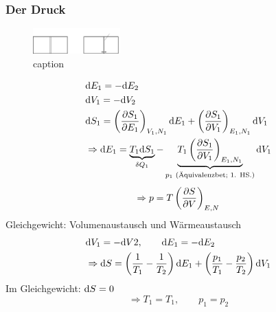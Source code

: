 \subsubsection{Der Druck}
\begin{figure}[H]
    \begin{center}
        \includegraphics[width=0.3\textwidth]{../img/derivationP.pdf}
        \caption{caption}  %
        \label{img:derivatoinP}
    \end{center}
\end{figure}
\begin{equation}
    \begin{split}
        & \mathrm{d} E_1 = - \mathrm{d} E_2 \\
        & \mathrm{d} V_1 = - \mathrm{d} V_2 \\
        & \mathrm{d} S_1 = \left( \frac{\partial S_1}{\partial E_1} \right)_{V_1, N_1} \mathrm{d} E_1 + \left( \frac{\partial S_1}{\partial V_1} \right)_{E_1, N_1} \mathrm{d} V_1 \\
        & \Rightarrow \mathrm{d} E_1 = \underbrace{T_1 \mathrm{d} S_1}_{\delta Q_1} - \underbrace{T_1 \left( \frac{\partial S_1}{\partial V_1} \right)_{E_1, N_1}}_{p_1 \text{ (Äquivalenzbet; 1. HS.)}} \mathrm{d} V_1
    \end{split}
\end{equation}
\begin{equation}
    \Rightarrow p = T \left( \frac{\partial S}{\partial V} \right)_{E, N}
\end{equation}
Gleichgewicht: Volumenaustausch und Wärmeaustausch
\begin{equation}
    \begin{split}
        & \mathrm{d} V_1 = - \mathrm{d} V2, \qquad \mathrm{d} E_1 = - \mathrm{d} E_2 \\
        & \Rightarrow \mathrm{d} S = \left( \frac{1}{T_1} - \frac{1}{T_2} \right) \mathrm{d} E_1 + \left( \frac{p_1}{T_1} - \frac{p_2}{T_2} \right) \mathrm{d} V_1
    \end{split}
\end{equation}
Im Gleichgewicht: $\mathrm{d} S = 0$
\begin{equation}
    \Rightarrow T_1 = T_1 , \qquad p_1 = p_2
\end{equation}

